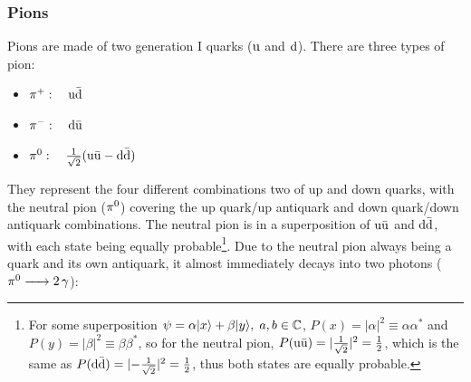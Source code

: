        \subsubsection{Pions}
            Pions are made of two generation I quarks ($\upquark$ and $\downquark$).
            There are three types of pion:
            \begin{itemize}
                \item $\pion[+]:\quad\mesonquarks[u][d]$
                \item $\pion[-]:\quad\mesonquarks[d][u]$
                \item $\pion[0]:\quad\overroot[2](\mesonquarks[u][u]-\mesonquarks[d][d])$
            \end{itemize}
            They represent the four different combinations two of up and down quarks, with the neutral pion ($\pion[0]$) covering the up quark/up antiquark and down quark/down antiquark combinations.
            The neutral pion is in a superposition of $\mesonquarks[u][u]$ and $\mesonquarks[d][d]$, with each state being equally probable\footnote{For some superposition $\psi=\alpha\ket{x}+\beta\ket{y},\;a,b\in\mathbb{C}$, $P(x)=|\alpha|^2\equiv\alpha\alpha^*$ and $P(y)=|\beta|^2\equiv\beta\beta^*$, so for the neutral pion, $P(\mesonquarks[u][u])=\lvert\overroot[2]\rvert^2=\half$, which is the same as $P(\mesonquarks[d][d])=\lvert-\overroot[2]\rvert^2=\half$, thus both states are equally probable.}.
            Due to the neutral pion always being a quark and its own antiquark, it almost immediately decays into two photons ($\ce{{\pion[0]} -> 2{\photon}}$):

